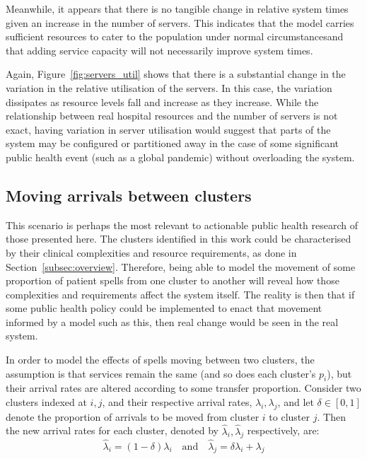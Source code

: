 \documentclass[11pt]{article}
\begin{document}
Meanwhile, it appears that there is no tangible change in relative system times
given an increase in the number of servers. This indicates that the model
carries sufficient resources to cater to the population under normal
circumstancesand that adding service capacity will not necessarily improve
system times.

Again, Figure~\ref{fig:servers_util} shows that there is a substantial change in
the variation in the relative utilisation of the servers. In this case, the
variation dissipates as resource levels fall and increase as they increase.
While the relationship between real hospital resources and the number of servers
is not exact, having variation in server utilisation would suggest that parts of
the system may be configured or partitioned away in the case of some significant
public health event (such as a global pandemic) without overloading the system.


\subsection{Moving arrivals between clusters}\label{subsec:moving}

This scenario is perhaps the most relevant to actionable public health research
of those presented here. The clusters identified in this work could be
characterised by their clinical complexities and resource requirements, as done
in Section~\ref{subsec:overview}. Therefore, being able to model the movement of
some proportion of patient spells from one cluster to another will reveal how
those complexities and requirements affect the system itself. The reality is
then that if some public health policy could be implemented to enact that
movement informed by a model such as this, then real change would be seen in the
real system.

In order to model the effects of spells moving between two clusters, the
assumption is that services remain the same (and so does each cluster's
\(p_i\)), but their arrival rates are altered according to some transfer
proportion. Consider two clusters indexed at \(i, j\), and their respective
arrival rates, \(\lambda_i, \lambda_j\), and let \(\delta \in [0, 1]\) denote
the proportion of arrivals to be moved from cluster \(i\) to cluster \(j\). Then
the new arrival rates for each cluster, denoted by \(\hat\lambda_i,
\hat\lambda_j\) respectively, are:
\begin{equation}\label{eq:moving}
    \hat\lambda_i = \left(1 - \delta\right) \lambda_i
    \quad \text{and} \quad
    \hat\lambda_j = \delta\lambda_i + \lambda_j
\end{equation}
\end{document}
